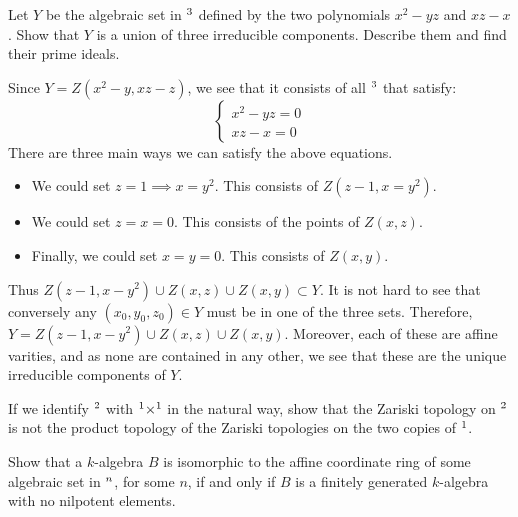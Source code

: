 \documentclass{hw_pset} %
\let\aa\relax
\DeclareMathOperator{\aa}{\mathbf{A}} %
\begin{document}
\begin{exercise}[1.3]
    Let $Y$ be the algebraic set in $\aa^3$ defined by the two polynomials
    $x^2 - yz$ and $xz - x$.
    Show that $Y$ is a union of three irreducible components.
    Describe them and find their prime ideals.
\end{exercise}

\begin{solution}
    Since $Y = Z(x^2 - y, xz - z)$,  we see that it consists of all $\aa^3$ that 
    satisfy:
    \[
        \begin{cases}
            x^2 - yz = 0\\
            xz - x = 0
        \end{cases}
    \]
    There are three main ways we can satisfy the above equations. 
    \begin{itemize}
        \item We could set $z = 1 \implies x = y^2$. This consists of $Z(z - 1, x = y^2)$.
        \item We could set $z = x = 0$. This consists of the points of $Z(x, z)$.
        \item Finally, we could set $x = y = 0$. This consists of $Z(x,y)$. 
    \end{itemize}
    Thus $Z(z - 1, x - y^2) \cup Z(x, z) \cup Z(x, y) \subset Y$. It is not 
    hard to see that conversely any $(x_0, y_0, z_0) \in Y$ must be in 
    one of the three sets. Therefore, $Y = Z(z - 1, x - y^2) \cup Z(x, z) \cup Z(x, y)$. 
    Moreover, each of these are affine varities, and as none are contained in any 
    other, we see that these are the unique irreducible components of $Y$.

\end{solution}

\begin{exercise}[1.4]
    If we identify $\aa^2$ with $\aa^1 \times \aa^1$ in the natural way, show
    that the Zariski topology on $\aa^2$ is not the product topology of the
    Zariski topologies on the two copies of $\aa^1$.
\end{exercise}

\begin{solution}

\end{solution}

\begin{exercise}[1.5]
    Show that a $k$-algebra $B$ is isomorphic to the affine coordinate ring of
    some algebraic set in $\aa^n$, for some $n$, if and only if $B$ is a
    finitely generated $k$-algebra with no nilpotent elements.
\end{exercise}
\end{document}
